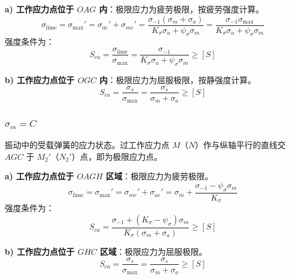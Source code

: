 \begin{theorem}[$\gamma=C$ 时的疲劳强度计算]
\label{thm:gammaC}
\textbf{a) 工作应力点位于 $OAG$ 内}：极限应力为疲劳极限，按疲劳强度计算。
\begin{equation}
	\sigma_{\mathrm{lime}}=\sigma_{\max}'=\sigma_{ae}'+\sigma_{me}'=\frac{\sigma_{-1}(\sigma_m+\sigma_a)}{K_\sigma\sigma_a+\psi_\sigma\sigma_m}=\frac{\sigma_{-1}\sigma_{\max}}{K_\sigma\sigma_a+\psi_\sigma\sigma_m}
	\label{eq:强度:gammaC极限应力}
\end{equation}
强度条件为：
\begin{equation}
	S_{ca}=\frac{\sigma_{\mathrm{lime}}}{\sigma_{\max}}=\frac{\sigma_{-1}}{K_\sigma\sigma_a+\psi_\sigma\sigma_m}\ge[S]
	\label{eq:强度:gammaC疲劳}
\end{equation}

\textbf{b) 工作应力点位于 $OGC$ 内}：极限应力为屈服极限，按静强度计算。
\begin{equation}
	S_{ca}=\frac{\sigma_s}{\sigma_{\max}}=\frac{\sigma_s}{\sigma_m+\sigma_a}\ge[S]
	\label{eq:强度:gammaC屈服}
\end{equation}
\end{theorem}

\subsubsection{$\sigma_m = C$}

振动中的受载弹簧的应力状态。过工作应力点 $M$（$N$）作与纵轴平行的直线交 $AGC$ 于 $M_2'$（$N_2'$）点，即为极限应力点。

\begin{theorem}[$\sigma_m=C$ 时的疲劳强度计算]
\label{thm:sigmaM}
\textbf{a) 工作应力点位于 $OAGH$ 区域}：极限应力为疲劳极限。
\begin{equation}
	\sigma_{\mathrm{lime}}=\sigma_{\max}'=\sigma_{me}'+\sigma_{ae}'=\sigma_m+\frac{\sigma_{-1}-\psi_\sigma\sigma_m}{K_\sigma}
	\label{eq:强度:sigmaM极限应力}
\end{equation}
强度条件为：
\begin{equation}
	S_{ca}=\frac{\sigma_{-1}+(K_\sigma-\psi_\sigma)\sigma_m}{K_\sigma(\sigma_m+\sigma_a)}\ge[S]
	\label{eq:强度:sigmaM疲劳}
\end{equation}

\textbf{b) 工作应力点位于 $GHC$ 区域}：极限应力为屈服极限。
\begin{equation}
	S_{ca}=\frac{\sigma_s}{\sigma_{\max}}=\frac{\sigma_s}{\sigma_m+\sigma_a}\ge[S]
	\label{eq:强度:sigmaM屈服}
\end{equation}
\end{theorem}

